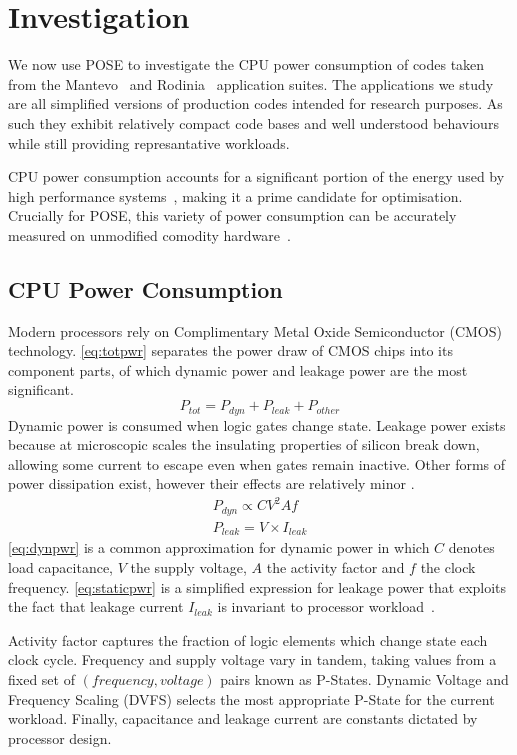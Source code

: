 \section{Investigation}
\label{sec:investigation}
We now use POSE to investigate the CPU power consumption of codes taken from the Mantevo~\cite{heroux:2009aa} and Rodinia~\cite{che:2009aa} application suites.
The applications we study are all simplified versions of production codes intended for research purposes.
As such they exhibit relatively compact code bases and well understood behaviours while still providing represantative workloads.

CPU power consumption accounts for a significant portion of the energy used by high performance systems~\cite{rong:2010aa}, making it a prime candidate for optimisation.
Crucially for POSE, this variety of power consumption can be accurately measured on unmodified comodity hardware~\cite{hackenberg:2013aa}.

\subsection{CPU Power Consumption}
\label{ssec:cpupower}
Modern processors rely on Complimentary Metal Oxide Semiconductor (CMOS) technology.
\autoref{eq:totpwr} separates the power draw of CMOS chips into its component parts, of which dynamic power and leakage power are the most significant.
\begin{equation}
\label{eq:totpwr}
P_{tot} = P_{dyn} + P_{leak} + P_{other}
\end{equation}
Dynamic power is consumed when logic gates change state.
Leakage power exists because at microscopic scales the insulating properties of silicon break down, allowing some current to escape even when gates remain inactive.
Other forms of power dissipation exist, however their effects are relatively minor \cite{kaxiras:2008aa}.
\begin{gather}
P_{dyn} \propto CV^{2}Af \label{eq:dynpwr} \\
P_{leak} = V \times I_{leak} \label{eq:staticpwr}
\end{gather}
\autoref{eq:dynpwr} is a common approximation for dynamic power in which $C$ denotes load capacitance, $V$ the supply voltage, $A$ the activity factor and $f$ the clock frequency.
\autoref{eq:staticpwr} is a simplified expression for leakage power that exploits the fact that leakage current $I_{leak}$ is invariant to processor workload~\cite{kim:2003aa}.

Activity factor captures the fraction of logic elements which change state each clock cycle.
Frequency and supply voltage vary in tandem, taking values from a fixed set of $(frequency, voltage)$ pairs known as P-States.
Dynamic Voltage and Frequency Scaling (DVFS) selects the most appropriate P-State for the current workload.
Finally, capacitance and leakage current are constants dictated by processor design.

